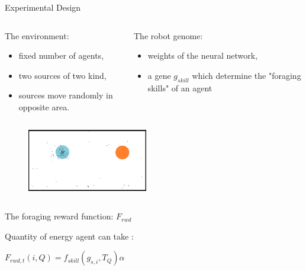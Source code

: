 \documentclass[8pt,handout,notes=show]{beamer}
\begin{document}
\begin{frame}{Experimental Design}
	\begin{columns}[t]

		
		
		\begin{block}{The environment:}
			\begin{itemize}
				\item fixed number of agents,
				\item two sources of two kind,
				\item sources move randomly in opposite area.
			\end{itemize}
		\end{block}
		

		\begin{block}{The robot genome:}
			\begin{itemize}
				\item weights of the neural network,
				\item a gene $g_{skill}$ which determine the "foraging skills" of an agent
			\end{itemize}
		\end{block}
		
	\end{columns}

	\begin{figure}
		\includegraphics[height=2.75cm]{images/1roborob_sp_201106}
	\end{figure}

	\begin{columns}
	


		\begin{block}{The foraging reward function: $F_{rwd}$}

			Quantity of energy agent can take :

		$F_{rwd,t}(i,Q) = f_{skill}\left(g_{s,i},T_Q\right)\alpha$%

		\end{block}

	\end{columns}
\end{frame}
\end{document}
